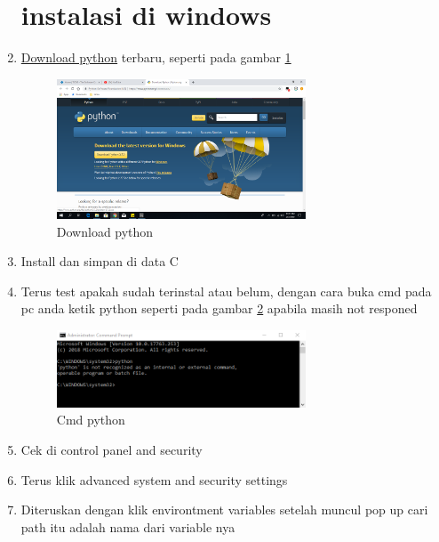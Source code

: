 \begin{enumerate}
	
\section{instalasi di windows}
	
\item   \href{https://www.python.org/downloads/}{Download python} terbaru, seperti pada gambar \ref{Download}
\begin{figure}[ht]
	\centerline{\includegraphics[width=0.70\textwidth]{figures/download_python.PNG}}
	\caption{Download python}
	\label{Download}
\end{figure}
	
\item	Install dan simpan di data C
	
\item	Terus test apakah sudah terinstal atau belum, dengan cara buka cmd pada pc anda ketik python seperti pada gambar \ref{cmd_python} apabila masih not responed
\begin{figure}[ht]
	\centerline{\includegraphics[width=0.70\textwidth]{figures/cmd_python.PNG}}
	\caption{Cmd python}
	\label{cmd_python}
\end{figure}
	
\item	Cek di control panel and security
	
\item	Terus klik advanced system and security settings
	
\item	Diteruskan dengan klik environtment variables setelah muncul pop up cari path itu adalah nama dari variable nya
	

\end{enumerate}
